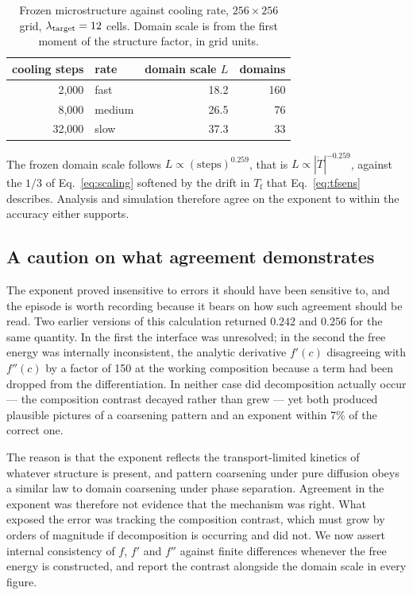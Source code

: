 \documentclass[preprint,12pt,authoryear]{elsarticle}
\newcommand{\Tf}{T_{\mathrm{f}}}
\begin{document}
\begin{table}[htbp]
\centering
\caption{Frozen microstructure against cooling rate, $256\times256$ grid,
$\lambda_{\rm target} = 12$ cells. Domain scale is from the first moment of the
structure factor, in grid units.}
\label{tab:rates}
\small
\begin{tabular}{rlrr}
\toprule
cooling steps & rate & domain scale $L$ & domains \\
\midrule
 2{,}000 & fast   & 18.2 & 160 \\
 8{,}000 & medium & 26.5 &  76 \\
32{,}000 & slow   & 37.3 &  33 \\
\bottomrule
\end{tabular}
\end{table}

The frozen domain scale follows $L \propto (\text{steps})^{0.259}$, that is
$L \propto |\dot{T}|^{-0.259}$, against the $1/3$ of Eq.~\eqref{eq:scaling}
softened by the drift in $\Tf$ that Eq.~\eqref{eq:tfsens} describes. Analysis
and simulation therefore agree on the exponent to within the accuracy either
supports.

\subsection{A caution on what agreement demonstrates}

The exponent proved insensitive to errors it should have been sensitive to, and
the episode is worth recording because it bears on how such agreement should be
read. Two earlier versions of this calculation returned $0.242$ and $0.256$ for
the same quantity. In the first the interface was unresolved; in the second the
free energy was internally inconsistent, the analytic derivative $f'(c)$
disagreeing with $f''(c)$ by a factor of 150 at the working composition because
a term had been dropped from the differentiation. In neither case did
decomposition actually occur --- the composition contrast decayed rather than
grew --- yet both produced plausible pictures of a coarsening pattern and an
exponent within 7\% of the correct one.

The reason is that the exponent reflects the transport-limited kinetics of
whatever structure is present, and pattern coarsening under pure diffusion obeys
a similar law to domain coarsening under phase separation. Agreement in the
exponent was therefore not evidence that the mechanism was right. What exposed
the error was tracking the composition contrast, which must grow by orders of
magnitude if decomposition is occurring and did not. We now assert internal
consistency of $f$, $f'$ and $f''$ against finite differences whenever the free
energy is constructed, and report the contrast alongside the domain scale in
every figure.
\end{document}
